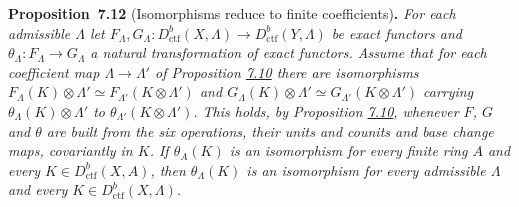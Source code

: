 \documentclass[11pt]{article}
\newenvironment{bpstatement}[2]{\par\addvspace{0.6\baselineskip}\noindent\textbf{#1}#2\textbf{.}\enspace\ignorespaces}
  {\par\addvspace{0.4\baselineskip}}
\newenvironment{bpstatementit}[2]{\begin{bpstatement}{#1}{#2}\itshape\ignorespaces}{\end{bpstatement}}
\begin{document}
\label{bp34}%
\begin{bpstatementit}{Proposition~7.12}{ (Isomorphisms reduce to finite coefficients)}
For each admissible \(\Lambda\) let \(F_\Lambda,G_\Lambda:D^b_{\mathrm{ctf}}(X,\Lambda)\to D^b_{\mathrm{ctf}}(Y,\Lambda)\) be exact functors and \(\theta_\Lambda:F_\Lambda\to G_\Lambda\) a natural transformation of exact functors. Assume that for each coefficient map \(\Lambda\to\Lambda'\) of Proposition \hyperref[bp26]{7.10} there are isomorphisms \(F_\Lambda(K)\otimes\Lambda'\simeq F_{\Lambda'}(K\otimes\Lambda')\) and \(G_\Lambda(K)\otimes\Lambda'\simeq G_{\Lambda'}(K\otimes\Lambda')\) carrying \(\theta_\Lambda(K)\otimes\Lambda'\) to \(\theta_{\Lambda'}(K\otimes\Lambda')\). This holds, by Proposition \hyperref[bp26]{7.10}, whenever \(F\), \(G\) and \(\theta\) are built from the six operations, their units and counits and base change maps, covariantly in \(K\). If \(\theta_A(K)\) is an isomorphism for every finite ring \(A\) and every \(K\in D^b_{\mathrm{ctf}}(X,A)\), then \(\theta_\Lambda(K)\) is an isomorphism for every admissible \(\Lambda\) and every \(K\in D^b_{\mathrm{ctf}}(X,\Lambda)\).
\end{bpstatementit}
\end{document}
